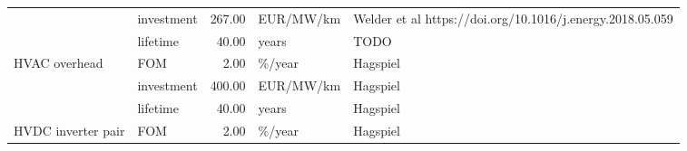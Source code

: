 \begin{longtable}{p{5cm}p{3cm}rp{3cm}p{11cm}}
                      & investment &         267.00 &                         EUR/MW/km &                                                                                                                                                                                                                                                                            Welder et al https://doi.org/10.1016/j.energy.2018.05.059 \\
                      & lifetime &          40.00 &                             years &                                                                                                                                                                                                                                                                                                                                 TODO \\
HVAC overhead & FOM &           2.00 &                            \%/year &                                                                                                                                                                                                                                                                                                                             Hagspiel \\
                      & investment &         400.00 &                         EUR/MW/km &                                                                                                                                                                                                                                                                                                                             Hagspiel \\
                      & lifetime &          40.00 &                             years &                                                                                                                                                                                                                                                                                                                             Hagspiel \\
HVDC inverter pair & FOM &           2.00 &                            \%/year &                                                                                                                                                                                                                                                                                                                             Hagspiel \\

\end{longtable}
